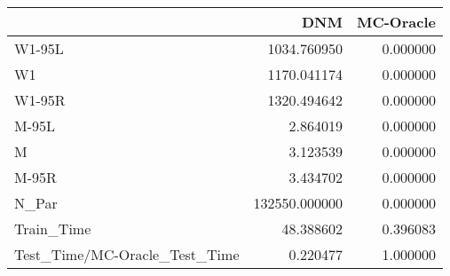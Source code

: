 \begin{tabular}{lrr}
\toprule
{} &            DNM &  MC-Oracle \\
\midrule
W1-95L                        &    1034.760950 &   0.000000 \\
W1                            &    1170.041174 &   0.000000 \\
W1-95R                        &    1320.494642 &   0.000000 \\
M-95L                         &       2.864019 &   0.000000 \\
M                             &       3.123539 &   0.000000 \\
M-95R                         &       3.434702 &   0.000000 \\
N\_Par                         &  132550.000000 &   0.000000 \\
Train\_Time                    &      48.388602 &   0.396083 \\
Test\_Time/MC-Oracle\_Test\_Time &       0.220477 &   1.000000 \\
\bottomrule
\end{tabular}
